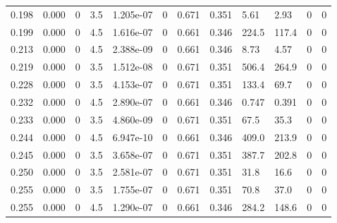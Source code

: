 \documentclass[preview]{standalone}
\begin{document}
{{\begin{tabular}{L{1.2cm}C{1.2cm} C{0.3cm}C{0.5cm} C{1.4cm}C{1.4cm} C{1.4cm}C{1.4cm} C{1.6cm}C{1.6cm} C{1.6cm}C{1.6cm}}
  0.198  &  0.000  & 0     & 3.5 &  1.205e-07  & 0  &  0.671&   0.351& 5.61 & 2.93   &  0 & 0  \\ 
  0.199  &  0.000  & 0     & 4.5 &  1.616e-07  & 0  &  0.661&   0.346& 224.5 & 117.4   &  0 & 0  \\ 
  0.213  &  0.000  & 0     & 4.5 &  2.388e-09  & 0  &  0.661&   0.346& 8.73 & 4.57   &  0 & 0  \\ 
  0.219  &  0.000  & 0     & 3.5 &  1.512e-08  & 0  &  0.671&   0.351& 506.4 & 264.9   &  0 & 0  \\ 
  0.228  &  0.000  & 0     & 3.5 &  4.153e-07  & 0  &  0.671&   0.351& 133.4 & 69.7   &  0 & 0  \\ 
  0.232  &  0.000  & 0     & 4.5 &  2.890e-07  & 0  &  0.661&   0.346& 0.747 & 0.391   &  0 & 0  \\ 
  0.233  &  0.000  & 0     & 3.5 &  4.860e-09  & 0  &  0.671&   0.351& 67.5 & 35.3   &  0 & 0  \\ 
  0.244  &  0.000  & 0     & 4.5 &  6.947e-10  & 0  &  0.661&   0.346& 409.0 & 213.9   &  0 & 0  \\ 
  0.245  &  0.000  & 0     & 3.5 &  3.658e-07  & 0  &  0.671&   0.351& 387.7 & 202.8   &  0 & 0  \\ 
  0.250  &  0.000  & 0     & 3.5 &  2.581e-07  & 0  &  0.671&   0.351& 31.8 & 16.6   &  0 & 0  \\ 
  0.255  &  0.000  & 0     & 3.5 &  1.755e-07  & 0  &  0.671&   0.351& 70.8 & 37.0   &  0 & 0  \\ 
  0.255  &  0.000  & 0     & 4.5 &  1.290e-07  & 0  &  0.661&   0.346& 284.2 & 148.6   &  0 & 0  \\ 
\hline 
\end{tabular} 

}}
\end{document}
